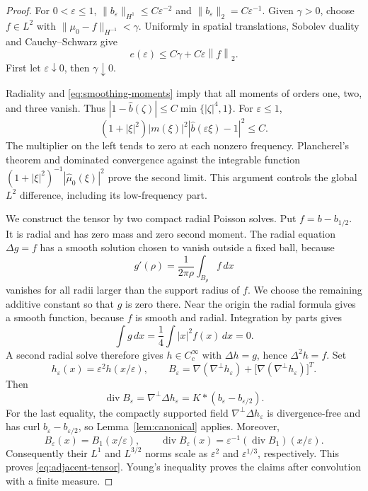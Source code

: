 \documentclass[11pt,a4paper,reqno]{amsart}
\theoremstyle{plain}
\theoremstyle{definition}
\theoremstyle{remark}
\numberwithin{equation}{section}
\newcommand{\Div}{\operatorname{div}}
\newcommand{\norm}[2]{\left\|#1\right\|_{#2}}
\newcommand{\dd}{\,dx}
\begin{document}
\begin{proof}
For $0<\varepsilon\le1$,
$\|b_\varepsilon\|_{H^1}\le C\varepsilon^{-2}$ and
$\|b_\varepsilon\|_2=C\varepsilon^{-1}$. Given $\gamma>0$, choose
$f\in L^2$ with $\|\mu_0-f\|_{H^{-1}}<\gamma$. Uniformly in spatial
translations, Sobolev duality and Cauchy--Schwarz give
\[
 e(\varepsilon)\le C\gamma+C\varepsilon\norm f2.
\]
First let $\varepsilon\downarrow0$, then $\gamma\downarrow0$.

Radiality and \eqref{eq:smoothing-moments} imply that all moments of
orders one, two, and three vanish. Thus
$|1-\widehat b(\zeta)|\le C\min\{|\zeta|^4,1\}$. For
$\varepsilon\le1$,
\[
 (1+|\xi|^2)|m(\xi)|^2
       |\widehat b(\varepsilon\xi)-1|^2\le C.
\]
The multiplier on the left tends to zero at each nonzero frequency.
Plancherel's theorem and dominated convergence against the integrable
function $(1+|\xi|^2)^{-1}|\widehat\mu_0(\xi)|^2$ prove the
second limit. This argument controls the global $L^2$ difference,
including its low-frequency part.

We construct the tensor by two compact radial Poisson solves. Put
$f=b-b_{1/2}$. It is radial and has zero mass and zero second moment.
The radial equation $\Delta g=f$ has a smooth solution chosen to
vanish outside a fixed ball, because
\[
 g'(\rho)=\frac{1}{2\pi\rho}\int_{B_\rho}f\dd
\]
vanishes for all radii larger than the support radius of $f$.
We choose the remaining additive constant so that $g$ is zero there.
Near the origin the radial formula gives a smooth function, because
$f$ is smooth and radial. Integration by parts gives
\[
 \int g\dd=\frac14\int |x|^2 f(x)\dd=0.
\]
A second radial solve therefore gives $h\in C_c^\infty$ with
$\Delta h=g$, hence $\Delta^2h=f$. Set
\[
 h_\varepsilon(x)=\varepsilon^2h(x/\varepsilon),\qquad
 B_\varepsilon=
 \nabla(\nabla^\perp h_\varepsilon)
 +\bigl[\nabla(\nabla^\perp h_\varepsilon)\bigr]^T.
\]
Then
\[
 \Div B_\varepsilon=\nabla^\perp\Delta h_\varepsilon
       =K*(b_\varepsilon-b_{\varepsilon/2}).
\]
For the last equality, the compactly supported field
$\nabla^\perp\Delta h_\varepsilon$ is divergence-free and has
curl $b_\varepsilon-b_{\varepsilon/2}$, so
Lemma~\ref{lem:canonical} applies. Moreover,
\[
 B_\varepsilon(x)=B_1(x/\varepsilon),\qquad
 \Div B_\varepsilon(x)=\varepsilon^{-1}
                         (\Div B_1)(x/\varepsilon).
\]
Consequently their $L^1$ and $L^{3/2}$ norms scale as
$\varepsilon^2$ and $\varepsilon^{1/3}$, respectively. This proves
\eqref{eq:adjacent-tensor}. Young's inequality proves the claims after
convolution with a finite measure.
\end{proof}
\end{document}
